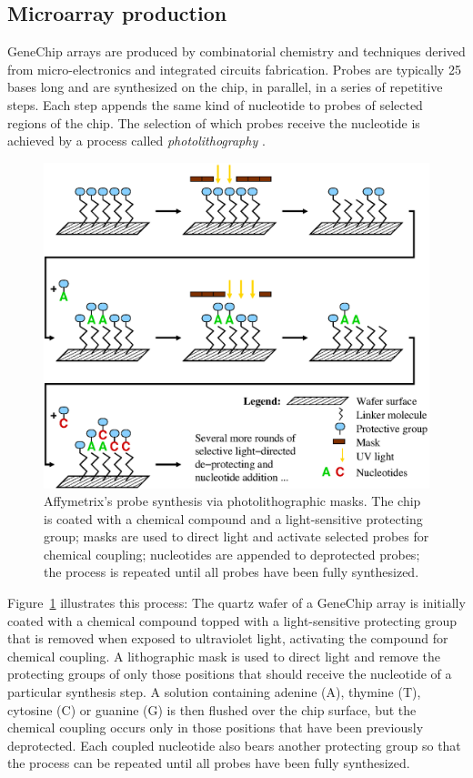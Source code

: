 \documentclass{w-edbk}
\begin{document}
\subsection{Microarray production}

GeneChip arrays are produced by combinatorial chemistry and techniques derived
from micro-electronics and integrated circuits fabrication. Probes are typically
25 bases long and are synthesized on the chip, in parallel, in a series of
repetitive steps. Each step appends the same kind of nucleotide to probes of
selected
regions of the chip. The selection of which probes receive the nucleotide is
achieved by a process called \emph{photolithography} \citep{Fodor1991}.

\begin{figure}\centering
\includegraphics[width=.7\textwidth]{figures/production.eps}
\caption{Affymetrix's probe synthesis via photolithographic masks. The chip is
  coated with a chemical compound and a light-sensitive protecting group;
  masks are used to direct light and activate selected probes for chemical
  coupling; nucleotides are appended to deprotected probes; the process is
  repeated until all probes have been fully synthesized.}
\label{fig:photolithography}
\end{figure}

Figure~\ref{fig:photolithography} illustrates this process: The quartz
wafer of a GeneChip array is initially coated with a chemical compound
topped with a light-sensitive protecting group that is removed when
exposed to ultraviolet light, activating the compound for chemical
coupling. A lithographic mask is used to direct light and remove the
protecting groups of only those positions that should receive the
nucleotide of a particular synthesis step.  A solution containing
adenine (A), thymine (T), cytosine (C) or guanine (G) is then flushed
over the chip surface, but the chemical coupling occurs only in those
positions that have been previously deprotected. Each coupled
nucleotide also bears another protecting group so that the process can
be repeated until all probes have been fully synthesized.
\end{document}
